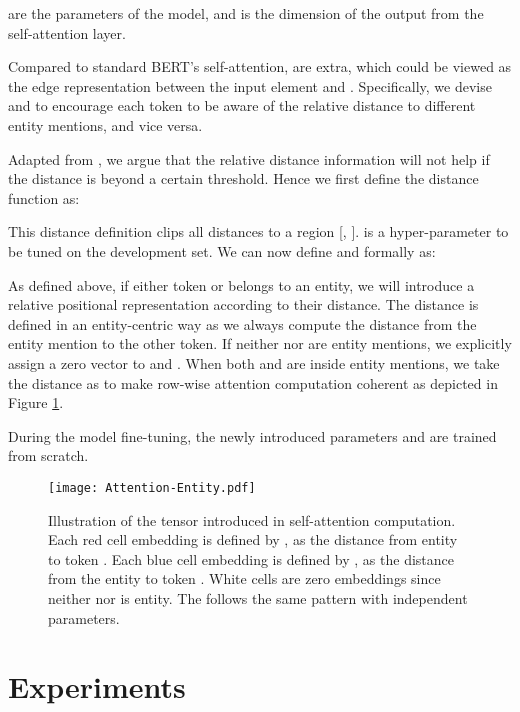 \documentclass[11pt,a4paper]{article}
\begin{document}
 are the parameters of the model, and  is the dimension of the output from the self-attention layer.  

Compared to standard BERT's self-attention,  are extra, which could be viewed as the edge representation between the input element  and  . Specifically, we 
devise  and  
to encourage each token to be aware of the relative distance to different entity mentions, and vice versa.

Adapted from \cite{shaw2018self}, we argue that the relative distance information will not help if the distance is beyond a certain threshold. Hence we first define the distance function as:

This distance definition clips all distances to a region [, ].
 is a hyper-parameter to be tuned on the development set. We can now define  and  formally as:


As defined above, if either token  or  belongs to an entity, we will introduce a relative positional representation according to their distance. The distance is defined in an entity-centric way as we always compute the distance from the entity mention to the other token. If neither  nor  are entity mentions, we explicitly assign a zero vector to  and . When both  and  are inside entity mentions, we take the distance as  to make row-wise attention computation coherent as depicted in Figure \ref{fig:entity-attention}.

During the model fine-tuning, the newly introduced parameters  and   are trained from scratch. 


\begin{figure}[t!]
  \centering
  \texttt{[image: Attention-Entity.pdf]}
  \caption{\small{Illustration of the tensor  introduced in self-attention computation. Each red cell embedding is defined by , as the distance from entity  to token . Each blue cell embedding is defined by , as the distance from the entity  to token  .  White cells are zero embeddings since neither  nor  is entity. The  follows the same pattern with independent parameters.}}
  \label{fig:entity-attention}
  \vspace{-2mm}
\end{figure}


\section{Experiments}
\end{document}

